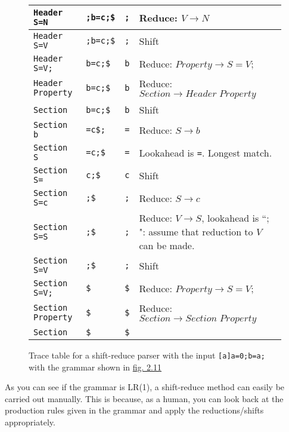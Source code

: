\begin{figure}[H]
\begin{center}
\begin{tabular}{| m{3.5cm} | m{3cm} | m{2cm} | m{5cm} |}
            \verb|Header S=N| & \verb|;b=c;$| & \verb|;| & Reduce: $V \rightarrow N$\\
            \hline
            \verb|Header S=V| & \verb|;b=c;$| & \verb|;| & Shift\\
            \hline
            \verb|Header S=V;| & \verb|b=c;$| & \verb|b| & Reduce: $Property \rightarrow S = V;$\\
            \hline
            \verb|Header Property| & \verb|b=c;$| & \verb|b| & Reduce: $Section \rightarrow Header\;Property$\\
            \hline
            \verb|Section| & \verb|b=c;$| & \verb|b| & Shift\\
            \hline
            \verb|Section b| & \verb|=c$;| & \verb|=| & Reduce: $S \rightarrow b$\\
            \hline
            \verb|Section S| & \verb|=c;$| & \verb|=| & Lookahead is \verb|=|. Longest match.\\
            \hline
            \verb|Section S=| & \verb|c;$| & \verb|c| & Shift\\
            \hline
            \verb|Section S=c| & \verb|;$| & \verb|;| & Reduce: $S \rightarrow c$\\
            \hline
            \verb|Section S=S| & \verb|;$| & \verb|;| & Reduce: $V \rightarrow S$, lookahead is ``$;$": assume that reduction to $V$ can be made.\\
            \hline
            \verb|Section S=V| & \verb|;$| & \verb|;| & Shift\\
            \hline
            \verb|Section S=V;| & \verb|$| & \verb|$| & Reduce: $Property \rightarrow S = V;$\\
            \hline
            \verb|Section Property| & \verb|$| & \verb|$| & Reduce: $Section \rightarrow Section\;Property$\\
            \hline
            \verb|Section| & \verb|$| & \verb|$| & \\
            \hline
        \end{tabular}
    \end{center}
    \cprotect\caption{\label{fig:2.12}Trace table for a shift-reduce parser with the input \verb|[a]a=0;b=a;| with the grammar shown in \hyperref[fig:2.11]{fig. 2.11}}
\end{figure}

As you can see if the grammar is LR(1), a shift-reduce method can easily be carried out manually. This is because, as a human, you can look back at the production rules given in the grammar and apply the reductions/shifts appropriately.

